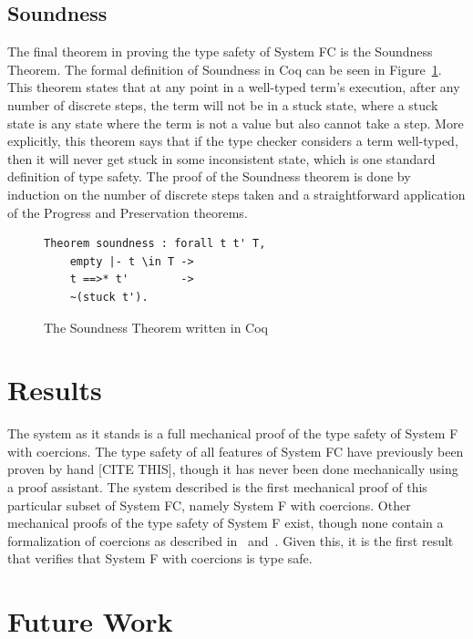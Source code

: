 \documentclass{sig-alternate}
\begin{document}
\subsection{Soundness}
\label{sec:implementation-soundness}

The final theorem in proving the type safety of System FC is the Soundness Theorem. The formal definition of Soundness in Coq can be seen in Figure~\ref{fig:soundness-coq}. This theorem states that at any point in a well-typed term's execution, after any number of discrete steps, the term will not be in a stuck state, where a stuck state is any state where the term is not a value but also cannot take a step. More explicitly, this theorem says that if the type checker considers a term well-typed, then it will never get stuck in some inconsistent state, which is one standard definition of type safety. The proof of the Soundness theorem is done by induction on the number of discrete steps taken and a straightforward application of the Progress and Preservation theorems.

\begin{figure}[h!]
\begin{lstlisting}
Theorem soundness : forall t t' T,
    empty |- t \in T ->
    t ==>* t'        ->
    ~(stuck t').
\end{lstlisting}
\caption{The Soundness Theorem written in Coq}
\label{fig:soundness-coq}
\end{figure}

\section{Results}
\label{sec:results}

The system as it stands is a full mechanical proof of the type safety of System F with coercions. The type safety of all features of System FC have previously been proven by hand [CITE THIS], though it has never been done mechanically using a proof assistant. The system described is the first mechanical proof of this particular subset of System FC, namely System F with coercions. Other mechanical proofs of the type safety of System F exist, though none contain a formalization of coercions as described in~\cite{Breitner:2014:SZC:2628136.2628141} and~\cite{DBLP:conf/tldi/YorgeyWCJVM12}. Given this, it is the first result that verifies that System F with coercions is type safe. 

\section{Future Work}
\label{sec:future-work}
\end{document}
